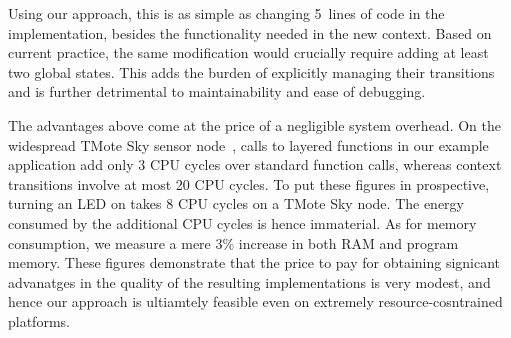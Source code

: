 Using our approach, this is as simple as changing 5~lines of code in
the \conesc implementation, besides the functionality needed in the
new  context.  Based on current practice, the same
modification would crucially require adding at least two global
states.  This adds the burden of explicitly managing their
transitions and is further detrimental to maintainability and ease
of debugging.

 The advantages above come at the price
of a negligible system overhead. On the widespread TMote Sky sensor
node~\cite{}, calls to layered functions in our example application
add only 3 CPU cycles over standard function calls, whereas context
transitions involve at most 20 CPU cycles. To put these figures in
prospective, turning an LED on takes 8 CPU cycles on a TMote Sky
node. The energy consumed by the additional CPU cycles is hence
immaterial. As for memory consumption, we measure a mere 3\% increase
in both RAM and program memory. These figures demonstrate that the
price to pay for obtaining signicant advanatges in the quality of the
resulting implementations is very modest, and hence our approach is
ultiamtely feasible even on extremely resource-cosntrained platforms.





